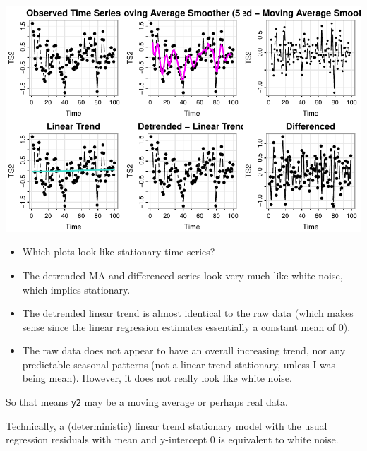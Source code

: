 \documentclass[
  letterpaper,
  DIV=11,
  numbers=noendperiod]{scrartcl}
\newenvironment{Shaded}{\begin{snugshade}}{\end{snugshade}}
\newcommand{\AttributeTok}[1]{\textcolor[rgb]{0.40,0.45,0.13}{#1}}
\newcommand{\FunctionTok}[1]{\textcolor[rgb]{0.28,0.35,0.67}{#1}}
\newcommand{\NormalTok}[1]{\textcolor[rgb]{0.00,0.23,0.31}{#1}}
\newcommand{\SpecialCharTok}[1]{\textcolor[rgb]{0.37,0.37,0.37}{#1}}
\newcommand{\StringTok}[1]{\textcolor[rgb]{0.13,0.47,0.30}{#1}}
\begin{document}
\begin{Shaded}
\end{Shaded}

\includegraphics{Lecture7_files/figure-pdf/unnamed-chunk-17-1.pdf}

\begin{itemize}
\item
  Which plots look like stationary time series?
\item
  The detrended MA and differenced series look very much like white
  noise, which implies stationary.
\item
  The detrended linear trend is almost identical to the raw data (which
  makes sense since the linear regression estimates essentially a
  constant mean of 0).
\item
  The raw data does not appear to have an overall increasing trend, nor
  any predictable seasonal patterns (not a linear trend stationary,
  unless I was being mean). However, it does not really look like white
  noise.
\end{itemize}

So that means \texttt{y2} may be a moving average or perhaps real data.

\begin{tcolorbox}[enhanced jigsaw, left=2mm, opacitybacktitle=0.6, coltitle=black, title=\textcolor{quarto-callout-note-color}{\faInfo}\hspace{0.5em}{How I could have been mean}, rightrule=.15mm, colbacktitle=quarto-callout-note-color!10!white, opacityback=0, toptitle=1mm, toprule=.15mm, breakable, bottomtitle=1mm, titlerule=0mm, colback=white, arc=.35mm, bottomrule=.15mm, leftrule=.75mm, colframe=quarto-callout-note-color-frame]

Technically, a (deterministic) linear trend stationary model with the
usual regression residuals with mean and y-intercept 0 is equivalent to
white noise.

\end{tcolorbox}
\end{document}
